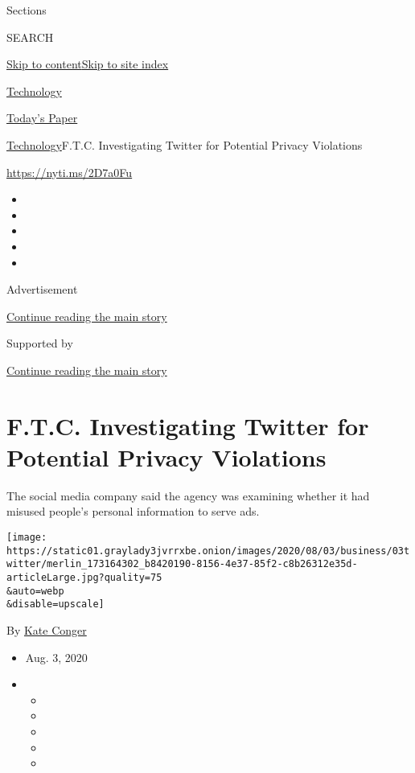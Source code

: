 Sections

SEARCH

\protect\hyperlink{site-content}{Skip to
content}\protect\hyperlink{site-index}{Skip to site index}

\href{https://www.nytimes3xbfgragh.onion/section/technology}{Technology}

\href{https://myaccount.nytimes3xbfgragh.onion/auth/login?response_type=cookie\&client_id=vi}{}

\href{https://www.nytimes3xbfgragh.onion/section/todayspaper}{Today's
Paper}

\href{/section/technology}{Technology}\textbar{}F.T.C. Investigating
Twitter for Potential Privacy Violations

\href{https://nyti.ms/2D7a0Fu}{https://nyti.ms/2D7a0Fu}

\begin{itemize}
\item
\item
\item
\item
\item
\end{itemize}

Advertisement

\protect\hyperlink{after-top}{Continue reading the main story}

Supported by

\protect\hyperlink{after-sponsor}{Continue reading the main story}

\hypertarget{ftc-investigating-twitter-for-potential-privacy-violations}{%
\section{F.T.C. Investigating Twitter for Potential Privacy
Violations}\label{ftc-investigating-twitter-for-potential-privacy-violations}}

The social media company said the agency was examining whether it had
misused people's personal information to serve ads.

\texttt{[image: https://static01.graylady3jvrrxbe.onion/images/2020/08/03/business/03twitter/merlin\_173164302\_b8420190-8156-4e37-85f2-c8b26312e35d-articleLarge.jpg?quality=75\\\&auto=webp\\\&disable=upscale]}

By \href{https://www.nytimes3xbfgragh.onion/by/kate-conger}{Kate Conger}

\begin{itemize}
\item
  Aug. 3, 2020
\item
  \begin{itemize}
  \item
  \item
  \item
  \item
  \item
  \end{itemize}
\end{itemize}

